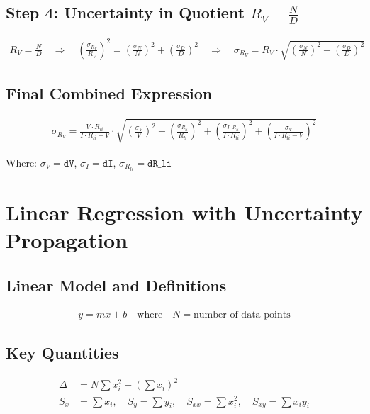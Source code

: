 \documentclass{article} %
\begin{document}
\subsection*{Step 4: Uncertainty in Quotient $R_V = \frac{N}{D}$}
\begin{align*}
R_V = \frac{N}{D} \quad \Rightarrow \quad \left(\frac{\sigma_{R_V}}{R_V}\right)^2 = \left(\frac{\sigma_N}{N}\right)^2 + \left(\frac{\sigma_D}{D}\right)^2 \quad \Rightarrow \quad \sigma_{R_V} = R_V \cdot \sqrt{\left(\frac{\sigma_N}{N}\right)^2 + \left(\frac{\sigma_D}{D}\right)^2}
\end{align*}

\subsection*{Final Combined Expression}
\begin{align*}
\sigma_{R_V} = \frac{V \cdot R_{li}}{I \cdot R_{li} - V} \cdot \sqrt{\left(\frac{\sigma_V}{V}\right)^2 + \left(\frac{\sigma_{R_{li}}}{R_{li}}\right)^2 + \left(\frac{\sigma_{I \cdot R_{li}}}{I \cdot R_{li}}\right)^2 + \left(\frac{\sigma_V}{I \cdot R_{li} - V}\right)^2}
\end{align*}

Where: $\sigma_V = \texttt{dV}$, $\sigma_I = \texttt{dI}$, $\sigma_{R_{li}} = \texttt{dR\_li}$

\newpage

\section{Linear Regression with Uncertainty Propagation}
\label{app:c_linear_uncertainties}

\subsection*{Linear Model and Definitions}
\begin{align*}
y = mx + b \quad \text{where} \quad N = \text{number of data points}
\end{align*}

\subsection*{Key Quantities}
\begin{align*}
\Delta &= N \sum x_i^2 - \left(\sum x_i\right)^2 \\
S_x &= \sum x_i, \quad S_y = \sum y_i, \quad S_{xx} = \sum x_i^2, \quad S_{xy} = \sum x_i y_i
\end{align*}
\end{document}
